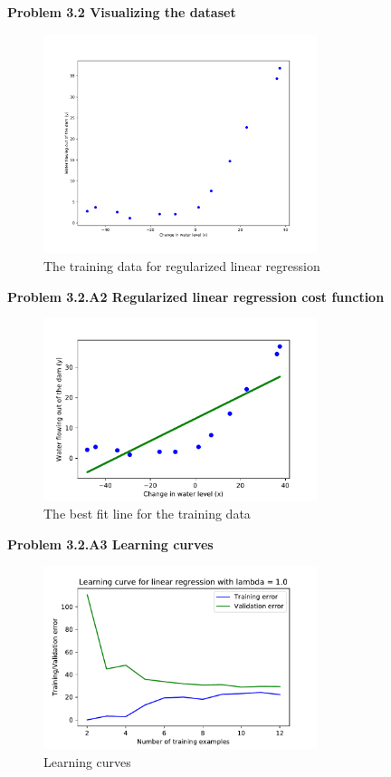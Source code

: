 \documentclass[]{book}
\theoremstyle{definition}
\begin{document}
\textbf{Problem 3.2 Visualizing the dataset}
\begin{figure}[H]
	\centering
	\includegraphics[width=8cm]{fig6.pdf}
	\caption{The training data for regularized linear regression}
	\label{fig:6}
\end{figure}

\textbf{Problem 3.2.A2 Regularized linear regression cost function}
\begin{figure}[H]
	\centering
	\includegraphics[width=8cm]{fig7.pdf}
	\caption{The best fit line for the training data}
	\label{fig:7}
\end{figure}

\textbf{Problem 3.2.A3 Learning curves}
\begin{figure}[H]
	\centering
	\includegraphics[width=8cm]{fig8.pdf}
	\caption{Learning curves}
	\label{fig:8}
\end{figure}
\end{document}
